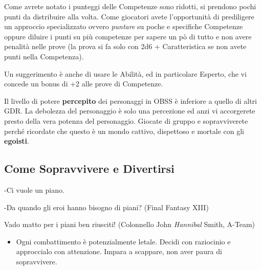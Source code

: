 \begin{multicols}{2}
Come avrete notato i punteggi delle Competenze sono ridotti, si prendono pochi punti da distribuire alla volta.
Come giocatori avete l'opportunità di prediligere un approccio specializzato ovvero \emph{puntare} su poche e specifiche Competenze oppure diluire i punti su più competenze per sapere un pò di tutto e non avere penalità nelle prove (la prova si fa solo con 2d6 + Caratteristica se non avete punti nella Competenza).

Un suggerimento è anche di usare le Abilità, ed in particolare Esperto, che vi concede un bonus di +2 alle prove di Competenze.

\begin{giocatore}
Il livello di potere \textbf{percepito} dei personaggi in OBSS è inferiore a quello di altri GDR. La debolezza del personaggio è solo una percezione ed anzi vi accorgerete presto della vera potenza del personaggio. Giocate di gruppo e sopravviverete perché ricordate che questo è un mondo cattivo, dispettoso e mortale con gli \textbf{egoisti}.
\end{giocatore}


\subsection{Come Sopravvivere e Divertirsi}\label{suggerimentigiocatori}

\begin{enfasi}{
-\noindent Ci vuole un piano.

-\noindent Da quando gli eroi hanno bisogno di piani? (Final Fantasy XIII)

\medskip

Vado matto per i piani ben riusciti! (Colonnello John \emph{Hannibal} Smith, A-Team)}
\end{enfasi}\medskip

\begin{itemize}[leftmargin=*] \setlength{\itemsep}{0pt}

\item
Ogni combattimento è potenzialmente letale. Decidi con raziocinio e approccialo con attenzione. Impara a scappare, non aver paura di sopravvivere.


\end{itemize}
\end{multicols}
